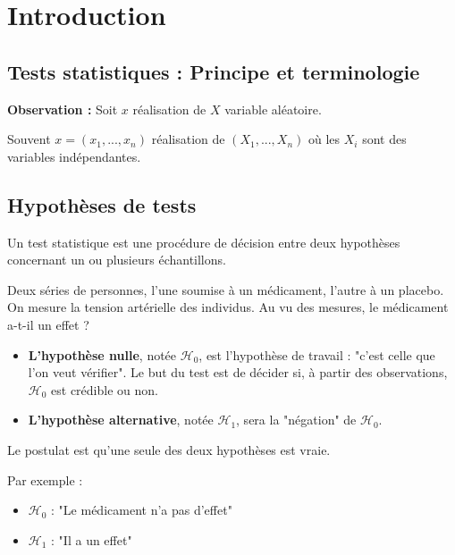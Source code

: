 \chapter{Introduction}

\section{Tests statistiques : Principe et terminologie}

\begin{observation}
\textbf{Observation :} Soit $x$ réalisation de $X$ variable aléatoire.

Souvent $x=(x_1,...,x_n)$ réalisation de $(X_1,...,X_n)$ où les $X_i$ sont des variables indépendantes.
\end{observation}

\section{Hypothèses de tests}

\begin{definition}
Un test statistique est une procédure de décision entre deux hypothèses concernant un ou plusieurs échantillons.
\end{definition}

\begin{exemple}
Deux séries de personnes, l'une soumise à un médicament, l'autre à un placebo. On mesure la tension artérielle des individus.
Au vu des mesures, le médicament a-t-il un effet ?
\end{exemple}


\begin{definition}
\begin{itemize}
\item \textbf{L'hypothèse nulle}, notée $\mathcal{H}_0$, est l'hypothèse de travail : "c'est celle que l'on veut vérifier".
Le but du test est de décider si, à partir des observations, $\mathcal{H}_0$ est crédible ou non.
\item \textbf{L'hypothèse alternative}, notée $\mathcal{H}_1$, sera la "négation" de $\mathcal{H}_0$.
\end{itemize}
Le postulat est qu'une seule des deux hypothèses est vraie.
\end{definition}

\begin{exemple}
Par exemple :
\begin{itemize}
\item $\mathcal{H}_0$ : "Le médicament n'a pas d'effet"
\item $\mathcal{H}_1$ : "Il a un effet"
\end{itemize}
\end{exemple}

